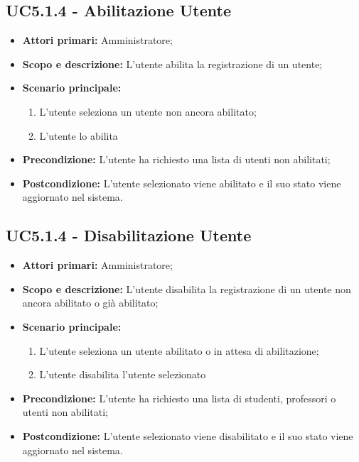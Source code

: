 \documentclass[AnalisiDeiRequisiti.tex]{subfiles}
\begin{document}
\subsection{UC5.1.4 - Abilitazione Utente}
\begin{itemize}
	\item \textbf{Attori primari:} Amministratore;
	\item \textbf{Scopo e descrizione:} L'utente abilita la registrazione di un utente;
	\item \textbf{Scenario principale:}
	\begin{enumerate}
		\item L'utente seleziona un utente non ancora abilitato;
		\item L'utente lo abilita
	\end{enumerate}
	\item \textbf{Precondizione:} L'utente ha richiesto una lista di utenti non abilitati; 
	\item \textbf{Postcondizione:} L'utente selezionato viene abilitato e il suo stato viene aggiornato nel sistema.
\end{itemize}
\subsection{UC5.1.4 - Disabilitazione Utente}
\begin{itemize}
	\item \textbf{Attori primari:} Amministratore;
	\item \textbf{Scopo e descrizione:} L'utente disabilita la registrazione di un utente non ancora abilitato o già abilitato;
	\item \textbf{Scenario principale:}
	\begin{enumerate}
		\item L'utente seleziona un utente abilitato o in attesa di abilitazione;
		\item L'utente disabilita l'utente selezionato
	\end{enumerate}
	\item \textbf{Precondizione:} L'utente ha richiesto una lista di studenti, professori o utenti non abilitati; 
	\item \textbf{Postcondizione:} L'utente selezionato viene disabilitato e il suo stato viene aggiornato nel sistema.
\end{itemize}
\end{document}
